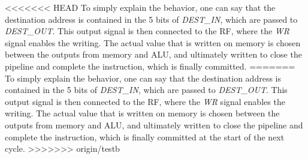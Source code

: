 <<<<<<< HEAD
To simply explain the behavior, one can say that the destination address is contained in the 5 bits of \textit{DEST\_IN}, which are passed to \textit{DEST\_OUT}. This output signal is then connected to the \textsc{RF}, where the \textit{WR} signal enables the writing. The actual value that is written on memory is chosen between the outputs from memory and ALU, and ultimately written to close the pipeline and complete the instruction, which is finally committed.
=======
To simply explain the behavior, one can say that the destination address is 
contained in the 5 bits of \textit{DEST\_IN}, which are passed to 
\textit{DEST\_OUT}. This output signal is then connected to the \textsc{RF}, 
where the \textit{WR} signal enables the writing. The actual value that is 
written on memory is chosen between the outputs from memory and ALU, and 
ultimately written to close the pipeline and complete the instruction, which is 
finally committed at the start of the next cycle.
>>>>>>> origin/testb




